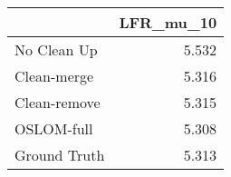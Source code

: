 \begin{tabular}{lr}
\toprule
{} & LFR_mu_10 \\
\midrule
No Clean Up  &     5.532 \\
Clean-merge  &     5.316 \\
Clean-remove &     5.315 \\
OSLOM-full   &     5.308 \\
Ground Truth &     5.313 \\
\bottomrule
\end{tabular}
